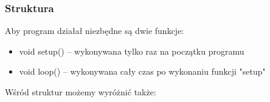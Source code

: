 \documentclass[a4paper,12pt, twoside]{article}
\begin{document}
\subsubsection  {Struktura}
\label{subsec:struktura}
	Aby program działał niezbędne są dwie funkcje:
	\renewcommand{\labelitemii}{$\circ$}
	\begin{itemize}
	
	  \item void setup() -- wykonywana tylko raz na początku programu
		
	  \item void loop() -- wykonywana cały czas po wykonaniu funkcji "setup"
	 
	\end{itemize}
	Wśród struktur możemy wyróżnić także:
\end{document}
